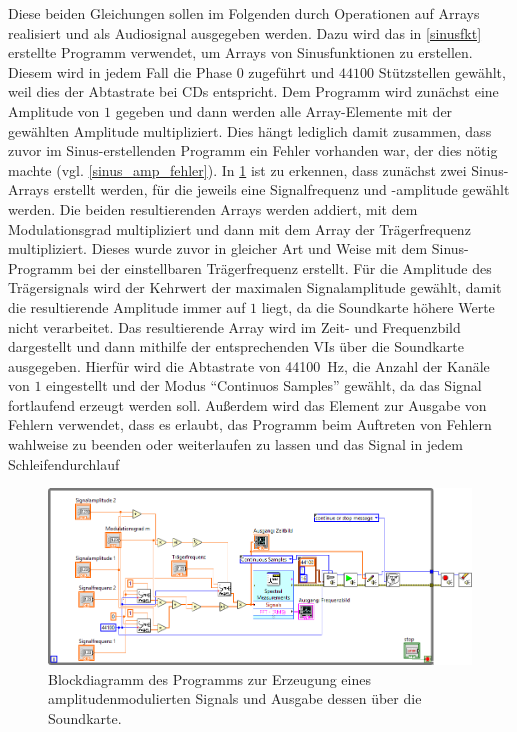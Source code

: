 \documentclass[
a4paper,
12pt,
pagesize,
ngerman
]{scrartcl}
\begin{document}
	Diese beiden Gleichungen sollen im Folgenden durch Operationen auf Arrays realisiert und als Audiosignal ausgegeben werden.	
	Dazu wird das in \cref{sinusfkt} erstellte Programm verwendet, um Arrays von Sinusfunktionen zu erstellen.
	Diesem wird in jedem Fall die Phase $0$ zugeführt und $44100$ Stützstellen gewählt, weil dies der Abtastrate bei CDs entspricht.
	Dem Programm wird zunächst eine Amplitude von $1$ gegeben und dann werden alle Array-Elemente mit der gewählten Amplitude multipliziert.
	Dies hängt lediglich damit zusammen, dass zuvor im Sinus-erstellenden Programm ein Fehler vorhanden war, der dies nötig machte (vgl. \cref{sinus_amp_fehler}).
	In \cref{fig_tag3_am_soundkarte_block} ist zu erkennen, dass zunächst zwei Sinus-Arrays erstellt werden, für die jeweils eine Signalfrequenz und -amplitude gewählt werden.
	Die beiden resultierenden Arrays werden addiert, mit dem Modulationsgrad multipliziert und dann mit dem Array der Trägerfrequenz multipliziert.
	Dieses wurde zuvor in gleicher Art und Weise mit dem Sinus-Programm bei der einstellbaren Trägerfrequenz erstellt.
	Für die Amplitude des Trägersignals wird der Kehrwert der maximalen Signalamplitude gewählt, damit die resultierende Amplitude immer auf $1$ liegt, da die Soundkarte höhere Werte nicht verarbeitet.
	Das resultierende Array wird im Zeit- und Frequenzbild dargestellt und dann mithilfe der entsprechenden VIs über die Soundkarte ausgegeben. %
	Hierfür wird die Abtastrate von \SI{44100}{\hertz}, die Anzahl der Kanäle von $1$ eingestellt und der Modus \enquote{Continuos Samples} gewählt, da das Signal fortlaufend erzeugt werden soll.
	Außerdem wird das Element zur Ausgabe von Fehlern verwendet, dass es erlaubt, das Programm beim Auftreten von Fehlern wahlweise zu beenden oder weiterlaufen zu lassen und das Signal in jedem Schleifendurchlauf 
	
	\begin{figure}[H]  
		\includegraphics[width=1\textwidth]{EIRE2018Dateien/Tag3/Soundkarteoutoszi/AMd}
		\centering
		\caption{
			Blockdiagramm des Programms zur Erzeugung eines amplitudenmodulierten Signals und Ausgabe dessen über die Soundkarte.
		}
		\label{fig_tag3_am_soundkarte_block}
		\centering
	\end{figure}
	
\end{document}
